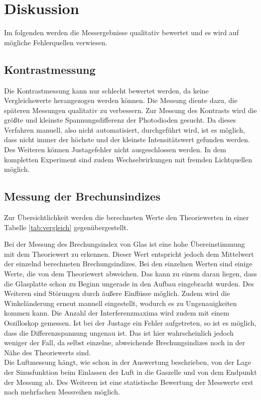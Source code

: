\section{Diskussion}
Im folgenden werden die Messergebnisse qualitativ bewertet und es wird auf
mögliche Fehlerquellen verwiesen.
\subsection{Kontrastmessung}
Die Kontrastmessung kann nur schlecht bewertet werden, da keine Vergleichswerte
herangezogen werden können. Die Messung diente dazu, die späteren Messungen
qualitativ zu verbessern. Zur Messung des Kontrasts wird die größte und kleinste
Spannungsdifferenz der Photodioden gesucht. Da dieses Verfahren manuell, also
nicht automatisiert, durchgeführt wird, ist es möglich, dass nicht immer der
höchste und der kleinste Intensitätswert gefunden werden. Des Weiteren können Justagefehler nicht
ausgeschlossen werden. In dem kompletten Experiment sind zudem
Wechselwirkungen mit fremden Lichtquellen möglich.

\subsection{Messung der Brechunsindizes}
Zur Übersichtlichkeit werden die berechneten Werte den Theoriewerten in einer
Tabelle \ref{tab:vergleich} gegenübergestellt.



Bei der Messung des Brechungsindex von Glas ist eine hohe Übereinstimmung mit
dem Theoriewert zu erkennen. Dieser Wert entspricht jedoch dem Mittelwert der
einzelnd berechneten Brechungsindizes. Bei den einzelnen Werten sind einige
Werte, die von dem Theoriewert abweichen. Das kann zu einem daran liegen, dass
die Glasplatte schon zu Beginn ungerade in den Aufbau eingebracht wurden. Des
Weiteren sind Störungen durch äußere Einflüsse möglich. Zudem wird die
Winkeländerung erneut manuell eingestellt, wodurch es zu Ungenauigkeiten
kommen kann.
Die Anzahl der Interferenzmaxima wird zudem mit einem
Oszilloskop gemessen. Ist bei der Justage ein Fehler aufgetreten, so ist es
möglich, dass die Differenzspannung ungenau ist. Das ist hier wahrscheinlich
jedoch weniger der Fall, da selbst einzelne, abweichende Brechungsindizes noch
in der Nähe des Theoriewerts sind. \\

Die Luftmessung hängt, wie schon in der Auswertung beschrieben, von der Lage
der Sinusfunktion beim Einlassen der Luft in die Gaszelle und von dem
Endpunkt der Messung ab. Des Weiteren
ist eine statistische Bewertung der Messwerte erst nach mehrfachen
Messreihen möglich.
